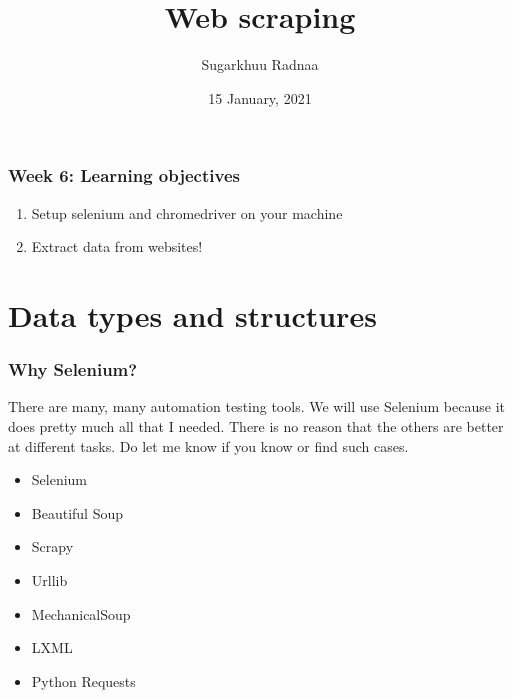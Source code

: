 \documentclass{beamer}
\title[Introduction to Python]{Web scraping}
\author{Sugarkhuu Radnaa}
\institute[]
{
Py4Econ in Ulaanbaatar \\ 
\medskip
\textit{py4econ@gmail.com} 
}
\date{15 January, 2021}  %
\begin{document}
\begin{frame}
\titlepage %
\end{frame}

\begin{frame}
    \frametitle{Week 6: Learning objectives}
    \begin{enumerate}
        \item Setup selenium and chromedriver on your machine
        \item Extract data from websites!
    \end{enumerate}
\end{frame}

\section{Data types and structures} 

\begin{frame}
    \frametitle{Why Selenium?}

    There are many, many automation testing tools. We will use Selenium because it does pretty much all that I needed. There is no reason
    that the others are better at different tasks. Do let me know if you know or find such cases. 

    \begin{itemize}
        \item Selenium
        \item Beautiful Soup
        \item Scrapy
        \item Urllib
        \item MechanicalSoup
        \item LXML
        \item Python Requests
    \end{itemize}
\end{frame}
\end{document}
